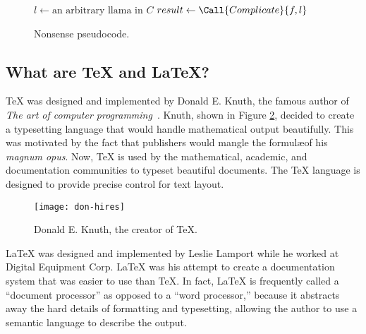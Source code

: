 \documentclass{uw-wkrpt}
\begin{document}
\begin{figure}
  \caption{Nonsense pseudocode.}
  \label{code:nonsense}
  \begin{algorithmic}[1]
        \State $l \gets \text{an arbitrary llama in $C$}$
        \State {}
        \State $result \gets \Call{Complicate}{f, l}$
          \State {}
        \EndIf
      \EndFor
    \EndFunction
  \end{algorithmic}
\end{figure}

\subsection{What are \TeX{} and \LaTeX{}?}
%
\TeX{} was designed and implemented by Donald E. Knuth, the famous author
of \textit{The art of computer programming}~\cite{ref:taocp}.  Knuth,
shown in Figure \ref{fig:knuth}, decided to create a typesetting language
that would handle mathematical output beautifully.  This was motivated
by the fact that publishers would mangle the formul\ae of his
\textit{magnum opus}.  Now, \TeX{} is used by the mathematical,
academic, and documentation communities to typeset beautiful
documents.  The \TeX{} language is designed to provide precise control
for text layout.

%
\begin{figure}
  \centering
  \texttt{[image: don-hires]}
  \caption[Donald E. Knuth, the creator of \TeX{}.]
          {Donald E. Knuth, the creator of \TeX{}.~\cite{ref:donpicture}}
  \label{fig:knuth}
\end{figure}

\LaTeX{} was designed and implemented by Leslie Lamport while he worked
at Digital Equipment Corp.  \LaTeX{} was his attempt to create a
documentation system that was easier to use than \TeX{}.  In fact,
\LaTeX{} is frequently called a ``document processor'' as opposed to a
``word processor,'' because it abstracts away the hard details of
formatting and typesetting, allowing the author to use a semantic
language to describe the output.
\end{document}
